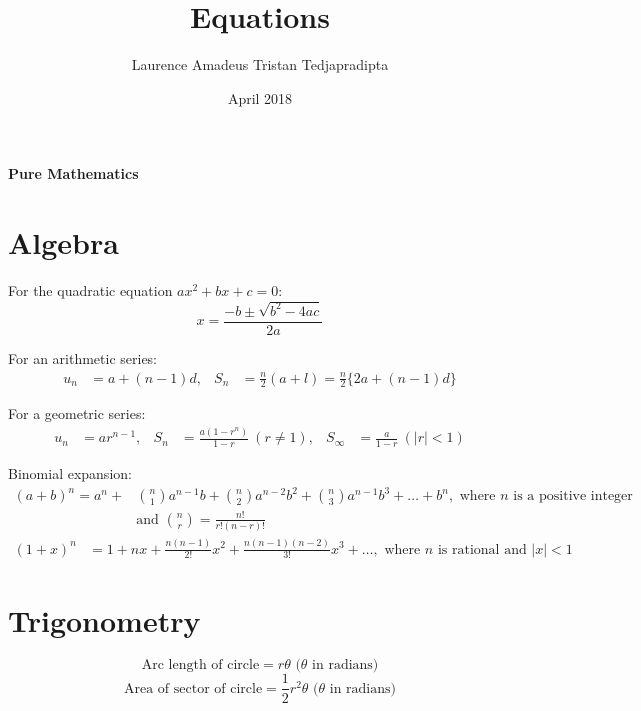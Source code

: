 \documentclass[a4paper]{article}
\title{Equations}
\author{Laurence Amadeus Tristan Tedjapradipta}
\date{April 2018}
\begin{document}
\begin{center}
    \Large{\textbf{Pure Mathematics}}
\end{center}

\section{Algebra}
\quad \enspace For the quadratic equation \(ax^2+bx+c=0\):
\begin{equation}
    x=\frac{-b \pm \sqrt{b^2-4ac}}{2a}
\end{equation}

For an arithmetic series:
\begin{align}
    u_n&=a+(n-1)d,     &  S_n&=\frac{n}{2}(a+l) = \frac{n}{2}\{2a+(n-1)d\}
\end{align}

For a geometric series:
\begin{align}
    u_n&=ar^{n-1}, & S_n&=\frac{a(1-r^n)}{1-r} \ (r \neq 1), & S_\infty &=\frac{a}{1-r} \ (|r| < 1)
\end{align}

Binomial expansion:
\begin{align}
    (a + b)^n = a^n + & \binom{n}{1} a^{n-1} b + \binom{n}{2} a^{n-2} b^2 + \binom{n}{3} a^{n-1} b^3 + \dots + b^n, \text{ where \(n\) is a positive integer} \\
    &\text{and } \binom{n}{r}=\frac{n!}{r!(n-r)!}
\end{align}
\begin{align}
    (1 + x)^n &= 1 + nx + \frac{n(n-1)}{2!} x^2 + \frac{n(n-1)(n-2)}{3!} x^3 + \dots, \text{ where \(n\) is rational and \(|x|<1\)}
\end{align}

\section{Trigonometry}
\begin{equation}
    \text{Arc length of circle} =r\theta \text{ (\(\theta\) in radians)}
\end{equation}
\begin{equation}
    \text{Area of sector of circle} =\frac{1}{2}r^2 \theta \text{ (\(\theta\) in radians)}
\end{equation}
\end{document}
